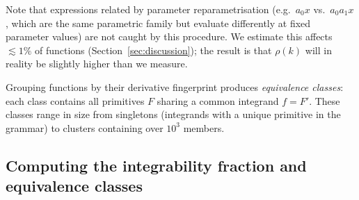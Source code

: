 \documentclass[preprint,12pt,authoryear]{elsarticle}
\newcommand{\rhok}{\rho(k)}
\newcommand{\codexadd}[1]{{\color{purple}#1}}
\newcommand{\hd}[1]{{\color{red}\textbf{[HD: #1]}}}
\begin{document}
Note that 
\codexadd{expressions related by parameter reparametrisation (e.g.\ $a_0 x$ vs.\ $a_0 a_1 x$, which are the same parametric family but evaluate differently at fixed parameter values) are not caught by this procedure.
We estimate this affects $\lesssim 1\%$ of functions (Section~\ref{sec:discussion}); the result is that $\rhok$ will in reality be slightly higher than we measure.}

Grouping functions by their derivative fingerprint produces \emph{equivalence classes}: each class contains all primitives $F$ sharing a common integrand $f = F'$. These classes range in size from singletons (integrands with a unique primitive in the grammar) to clusters containing over $10^3$ members.

\subsection{Computing the integrability fraction and equivalence classes}
\label{sec:computing_rho}
\end{document}
